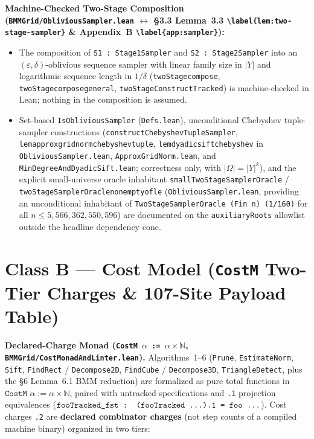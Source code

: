 \documentclass[10pt,letterpaper]{article}
\renewcommand{\_}{\origunderscore\allowbreak}
\newcommand{\code}[1]{\texttt{#1}}
\begin{document}
\textbf{Machine-Checked Two-Stage Composition (\code{BMMGrid/ObliviousSampler.lean} $\leftrightarrow$ \S 3.3 Lemma~3.3 \code{\textbackslash label\{lem:two-stage-sampler\}} \& Appendix~B \code{\textbackslash label\{app:sampler\}}):}
\begin{itemize}
  \item The composition of \code{S1 : Stage1Sampler} and \code{S2 : Stage2Sampler} into an $(\varepsilon, \delta)$-oblivious sequence sampler with linear family size in $|Y|$ and logarithmic sequence length in $1/\delta$ (\code{twoStage\_compose}, \code{twoStage\_compose\_general}, \code{twoStageConstructTracked}) is machine-checked in Lean; nothing in the composition is assumed.
  \item Set-based \code{IsObliviousSampler} (\code{Defs.lean}), unconditional Chebyshev tuple-sampler constructions (\code{constructChebyshevTupleSampler}, \code{lem\_approx\_grid\_norm\_chebyshev\_tuple}, \code{lem\_dyadic\_sift\_chebyshev} in \code{ObliviousSampler.lean}, \code{ApproxGridNorm.lean}, and \code{MinDegreeAndDyadicSift.lean}; correctness only, with $|\Omega| = |Y|^k$), and the explicit small-universe oracle inhabitant \code{smallTwoStageSamplerOracle} / \code{twoStageSamplerOracle\_nonempty\_of\_le} (\code{ObliviousSampler.lean}, providing an unconditional inhabitant of \code{TwoStageSamplerOracle (Fin n) (1/160)} for all $n \le 5{,}566{,}362{,}550{,}596$) are documented on the \code{auxiliaryRoots} allowlist outside the headline dependency cone.
\end{itemize}

\section{\texorpdfstring{Class B --- Cost Model (\code{CostM} Two-Tier Charges \& 107-Site Payload Table)}{Class B - Cost Model (CostM Two-Tier Charges and 107-Site Payload Table)}}
\label{sec:class-b}

\textbf{Declared-Charge Monad (\code{CostM $\alpha$ := $\alpha \times \mathbb{N}$}, \code{BMMGrid/CostMonadAndLinter.lean}).}
Algorithms~1--6 (\code{Prune}, \code{EstimateNorm}, \code{Sift}, \code{FindRect} / \code{Decompose2D}, \code{FindCube} / \code{Decompose3D}, \code{TriangleDetect}, plus the \S 6 Lemma~6.1 BMM reduction) are formalized as pure total functions in $\code{CostM }\alpha := \alpha \times \mathbb{N}$, paired with untracked specifications and \code{.1} projection equivalences ($\code{fooTracked\_fst : (fooTracked ...).1 = foo ...}$). Cost charges \code{.2} are \textbf{declared combinator charges} (not step counts of a compiled machine binary) organized in two tiers:
\end{document}
